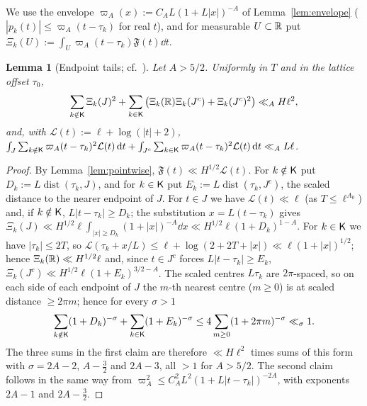 \documentclass[11pt]{amsart}
\newtheorem{lemma}[theorem]{Lemma}
\theoremstyle{definition}
\theoremstyle{remark}
\numberwithin{equation}{section}
\begin{document}
We use the envelope $\varpi_A(x):=C_AL(1+L|x|)^{-A}$ of Lemma~\ref{lem:envelope} ($|p_k(t)|\le\varpi_A(t-\tau_k)$ for real $t$), and for measurable $U\subset\mathbb R$ put $\Xi_k(U):=\int_U\varpi_A(t-\tau_k)\mathfrak F(t)\dd t$.

\begin{lemma}[Endpoint tails; cf.\ {\cite[Lemma~5.3]{HY26}}]\label{lem:tails}
Let $A>5/2$. Uniformly in $T$ and in the lattice offset $\tau_0$,
\[
\sum_{k\notin\mathsf K}\Xi_k(J)^2+\sum_{k\in\mathsf K}\big(\Xi_k(\mathbb R)\Xi_k(J^c)+\Xi_k(J^c)^2\big)\ll_AH\ell^2,
\]
and, with $\mathcal L(t):=\ell+\log(|t|+2)$,
$\int_J\sum_{k\notin\mathsf K}\varpi_A(t-\tau_k)^2\mathcal L(t)\,\mathrm d t+\int_{J^c}\sum_{k\in\mathsf K}\varpi_A(t-\tau_k)^2\mathcal L(t)\,\mathrm d t\ll_AL\ell$.
\end{lemma}
\begin{proof}
By Lemma~\ref{lem:pointwise}, $\mathfrak F(t)\ll H^{1/2}\mathcal L(t)$. For $k\notin\mathsf K$ put $D_k:=L\operatorname{dist}(\tau_k,J)$, and for $k\in\mathsf K$ put $E_k:=L\operatorname{dist}(\tau_k,J^c)$, the scaled distance to the nearer endpoint of $J$. For $t\in J$ we have $\mathcal L(t)\ll\ell$ (as $T\le\ell^{A_0}$) and, if $k\notin\mathsf K$, $L|t-\tau_k|\ge D_k$; the substitution $x=L(t-\tau_k)$ gives
$\Xi_k(J)\ll H^{1/2}\ell\int_{|x|\ge D_k}(1+|x|)^{-A}\dd x\ll H^{1/2}\ell(1+D_k)^{1-A}$. For $k\in\mathsf K$ we have $|\tau_k|\le2T$, so $\mathcal L(\tau_k+x/L)\le\ell+\log(2+2T+|x|)\ll\ell(1+|x|)^{1/2}$; hence $\Xi_k(\mathbb R)\ll H^{1/2}\ell$ and, since $t\in J^c$ forces $L|t-\tau_k|\ge E_k$, $\Xi_k(J^c)\ll H^{1/2}\ell(1+E_k)^{3/2-A}$. The scaled centres $L\tau_k$ are $2\pi$-spaced, so on each side of each endpoint of $J$ the $m$-th nearest centre ($m\ge0$) is at scaled distance $\ge2\pi m$; hence for every $\sigma>1$
\[
\sum_{k\notin\mathsf K}(1+D_k)^{-\sigma}+\sum_{k\in\mathsf K}(1+E_k)^{-\sigma}\le4\sum_{m\ge0}(1+2\pi m)^{-\sigma}\ll_\sigma1 .
\]
The three sums in the first claim are therefore $\ll H\ell^2$ times sums of this form with $\sigma=2A-2$, $A-\frac32$ and $2A-3$, all $>1$ for $A>5/2$. The second claim follows in the same way from $\varpi_A^2\le C_A^2L^2(1+L|t-\tau_k|)^{-2A}$, with exponents $2A-1$ and $2A-\frac32$.
\end{proof}
\end{document}
